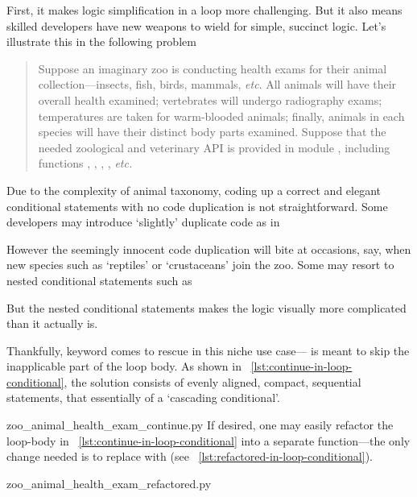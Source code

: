 First, it makes logic simplification in a loop more challenging.
But it also means skilled developers have new weapons to wield for simple, succinct logic.
Let's illustrate this in the following problem
\begin{quote}
    Suppose an imaginary zoo is conducting health exams for their animal collection---insects,
    fish, birds, mammals, \textit{etc}.
    All animals will have their overall health examined;
    vertebrates will undergo radiography exams;
    temperatures are taken for warm-blooded animals;
    finally, animals in each species will have their distinct body parts examined.
    Suppose that the needed zoological and veterinary API is provided in
    module , including functions ,
    , , , \textit{etc.}
\end{quote}


Due to the complexity of animal taxonomy, coding up a correct and elegant conditional statements
with no code duplication is not straightforward.
Some developers may introduce `slightly' duplicate code as in

However the seemingly innocent code duplication will bite at occasions, say,
when new species such as `reptiles' or `crustaceans' join the zoo.
Some may resort to nested conditional statements such as

But the nested conditional statements makes the logic visually more complicated than it actually is.


Thankfully, keyword  comes to rescue in this niche use case---
is meant to skip the inapplicable part of the loop body.
As shown in ~\autoref{lst:continue-in-loop-conditional}, the solution consists of evenly aligned,
compact, sequential statements, that essentially of a `cascading conditional'.

{zoo_animal_health_exam_continue.py}
If desired, one may easily refactor the loop-body in ~\autoref{lst:continue-in-loop-conditional}
into a separate function---the only change needed is to replace
 with  (see ~\autoref{lst:refactored-in-loop-conditional}).
\begin{clisting}[ht]
    
    {zoo_animal_health_exam_refactored.py}
\end{clisting}


